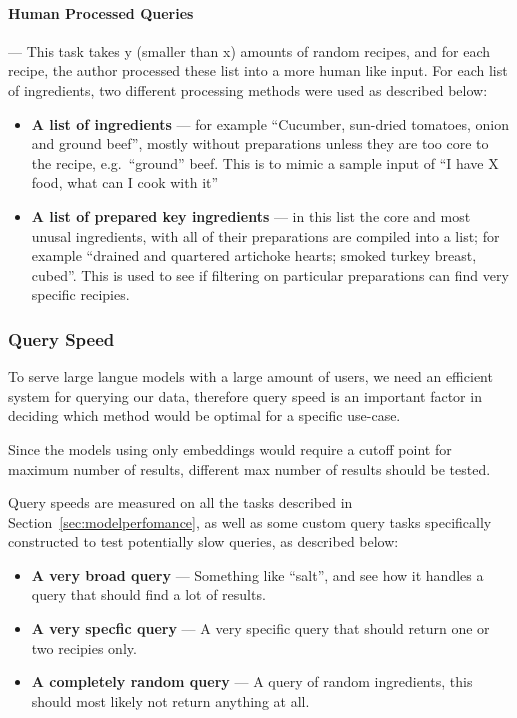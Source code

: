 \documentclass[11pt]{article}
\begin{document}
\paragraph{Human Processed Queries} --- This task takes y (smaller than x)
amounts of random recipes, and for each recipe, the author processed these list
into a more human like input.
For each list of ingredients, two different processing methods were used as
described below:
\begin{itemize}
    \item \textbf{A list of ingredients} --- for example ``Cucumber,
        sun-dried tomatoes, onion and ground beef'', mostly without preparations
        unless they are too core to the recipe, e.g.\ ``ground'' beef.
        This is to mimic a sample input of ``I have X food, what can I cook with it''
    \item \textbf{A list of prepared key ingredients} --- in this list the core
        and most unusal ingredients, with all of their preparations are compiled
        into a list; for example ``drained
        and quartered artichoke hearts; smoked turkey breast, cubed''.
        This is used to see if filtering on particular preparations can find
        very specific recipies.
\end{itemize}

\subsubsection{Query Speed}
To serve large langue models with a large amount of users, we need an efficient
system for querying our data, therefore query speed is an important factor in
deciding which method would be optimal for a specific use-case.

Since the models using only embeddings would require a cutoff point for
maximum number of results, different max number of results should be tested.

Query speeds are measured on all the tasks described in
Section~\ref{sec:modelperfomance}, as well as some custom query tasks
specifically constructed to test potentially slow queries, as described below:
\begin{itemize}
    \item \textbf{A very broad query} --- Something like ``salt'', and see how it
        handles a query that should find a lot of results.
    \item \textbf{A very specfic query} --- A very specific query that should
        return one or two recipies only.
    \item \textbf{A completely random query} --- A query of random ingredients,
        this should most likely not return anything at all.
\end{itemize}
\end{document}
